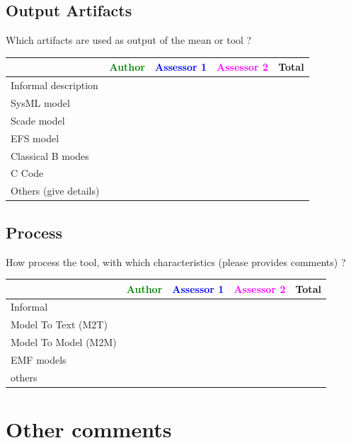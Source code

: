 \subsection{Output Artifacts}

Which artifacts are used as output of the mean or tool  ? 


\begin{tabular}{|l | c | c | c | c|}
\hline
& \textcolor{green}{Author} & \textcolor{blue}{Assessor 1} & \textcolor{magenta}{Assessor 2} & Total \\
\hline 
Informal description & & & &  \\
\hline
SysML model & & & & \\
\hline
Scade model & & & & \\
\hline
EFS model & & & & \\
\hline
Classical B modes & & & &  \\
\hline
C Code & & & & \\
\hline
Others (give details) & & & & \\
\hline
\end{tabular}


\subsection{Process}


How process the tool, with which characteristics (please provides comments) ? 


\begin{tabular}{|l | c | c | c | c|}
\hline
& \textcolor{green}{Author} & \textcolor{blue}{Assessor 1} & \textcolor{magenta}{Assessor 2} & Total \\
\hline 
Informal & & & &  \\
\hline
Model To Text (M2T) & & & & \\
\hline
Model To Model (M2M) & & & & \\
\hline
EMF models & & & & \\
\hline
others & & & & \\
\hline
\end{tabular}


\section{Other comments}

